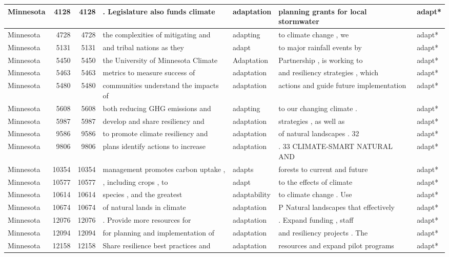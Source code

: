 \documentclass[
]{article}
\begin{document}
\begin{table}
\begin{tabular}[t]{l|r|r|l|l|l|l}
\hline
Minnesota & 4128 & 4128 & . Legislature also funds climate & adaptation & planning grants for local stormwater & adapt*\\
\hline
Minnesota & 4728 & 4728 & the complexities of mitigating and & adapting & to climate change , we & adapt*\\
\hline
Minnesota & 5131 & 5131 & and tribal nations as they & adapt & to major rainfall events by & adapt*\\
\hline
Minnesota & 5450 & 5450 & the University of Minnesota Climate & Adaptation & Partnership , is working to & adapt*\\
\hline
Minnesota & 5463 & 5463 & metrics to measure success of & adaptation & and resiliency strategies , which & adapt*\\
\hline
Minnesota & 5480 & 5480 & communities understand the impacts of & adaptation & actions and guide future implementation & adapt*\\
\hline
Minnesota & 5608 & 5608 & both reducing GHG emissions and & adapting & to our changing climate . & adapt*\\
\hline
Minnesota & 5987 & 5987 & develop and share resiliency and & adaptation & strategies , as well as & adapt*\\
\hline
Minnesota & 9586 & 9586 & to promote climate resiliency and & adaptation & of natural landscapes . 32 & adapt*\\
\hline
Minnesota & 9806 & 9806 & plans identify actions to increase & adaptation & . 33 CLIMATE-SMART NATURAL AND & adapt*\\
\hline
Minnesota & 10354 & 10354 & management promotes carbon uptake , & adapts & forests to current and future & adapt*\\
\hline
Minnesota & 10577 & 10577 & , including crops , to & adapt & to the effects of climate & adapt*\\
\hline
Minnesota & 10614 & 10614 & species , and the greatest & adaptability & to climate change . Use & adapt*\\
\hline
Minnesota & 10674 & 10674 & of natural lands in climate & adaptation & P Natural landscapes that effectively & adapt*\\
\hline
Minnesota & 12076 & 12076 & . Provide more resources for & adaptation & . Expand funding , staff & adapt*\\
\hline
Minnesota & 12094 & 12094 & for planning and implementation of & adaptation & and resiliency projects . The & adapt*\\
\hline
Minnesota & 12158 & 12158 & Share resilience best practices and & adaptation & resources and expand pilot programs & adapt*\\

\end{tabular}
\end{table}
\end{document}
